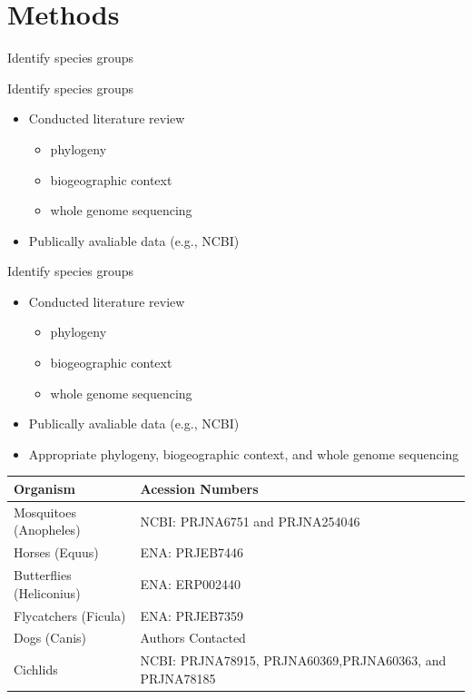 \documentclass[t,10pt]{beamer}
\begin{document}
\section{Methods}
\label{sec:orgheadline40}
\begin{frame}[label={sec:orgheadline33}]{Identify species groups}
\end{frame}
\begin{frame}[label={sec:orgheadline34}]{Identify species groups}
\begin{itemize}[<+->]
\item Conducted literature review
\begin{itemize}
\item phylogeny
\item biogeographic context
\item whole genome sequencing
\end{itemize}
\item Publically avaliable data (e.g., NCBI)
\end{itemize}
\end{frame}

\begin{frame}[label={sec:orgheadline35}]{Identify species groups}
\begin{itemize}
\item Conducted literature review
\begin{itemize}
\item phylogeny
\item biogeographic context
\item whole genome sequencing
\end{itemize}
\item Publically avaliable data (e.g., NCBI)
\item Appropriate phylogeny, biogeographic context, and whole genome sequencing
\end{itemize}
{\footnotesize
\begin{center}
\begin{tabular}{ll}
\hline
Organism & Acession Numbers\\
\hline
Mosquitoes (Anopheles) & NCBI: PRJNA6751 and PRJNA254046\\
Horses (Equus) & ENA: PRJEB7446\\
Butterflies (Heliconius) & ENA: ERP002440\\
Flycatchers (Ficula) & ENA: PRJEB7359\\
Dogs (Canis) & Authors Contacted\\
Cichlids & NCBI: PRJNA78915, PRJNA60369,PRJNA60363, and PRJNA78185\\
\hline
\end{tabular}
\end{center}
}
\end{frame}
\end{document}
